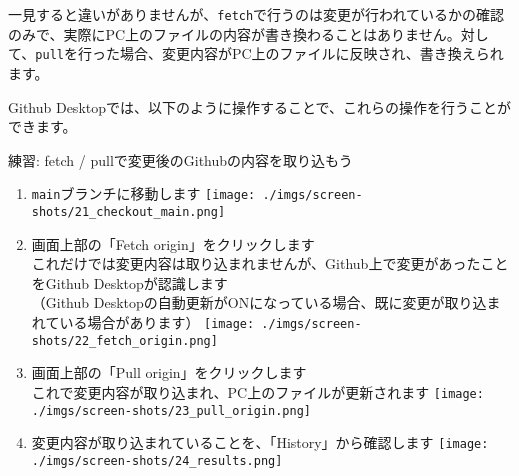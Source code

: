 一見すると違いがありませんが、\texttt{fetch}で行うのは変更が行われているかの確認のみで、実際にPC上のファイルの内容が書き換わることはありません。対して、\texttt{pull}を行った場合、変更内容がPC上のファイルに反映され、書き換えられます。

Github
Desktopでは、以下のように操作することで、これらの操作を行うことができます。

練習: fetch / pullで変更後のGithubの内容を取り込もう

\begin{enumerate}
\def\labelenumi{\arabic{enumi}.}
\item
  \texttt{main}ブランチに移動します
  \texttt{[image: ./imgs/screen-shots/21\_checkout\_main.png]}
\item
  画面上部の「Fetch origin」をクリックします\\
  これだけでは変更内容は取り込まれませんが、Github上で変更があったことをGithub
  Desktopが認識します\\
  （Github
  Desktopの自動更新がONになっている場合、既に変更が取り込まれている場合があります）
  \texttt{[image: ./imgs/screen-shots/22\_fetch\_origin.png]}
\item
  画面上部の「Pull origin」をクリックします\\
  これで変更内容が取り込まれ、PC上のファイルが更新されます
  \texttt{[image: ./imgs/screen-shots/23\_pull\_origin.png]}
\item
  変更内容が取り込まれていることを、「History」から確認します
  \texttt{[image: ./imgs/screen-shots/24\_results.png]}
\end{enumerate}
